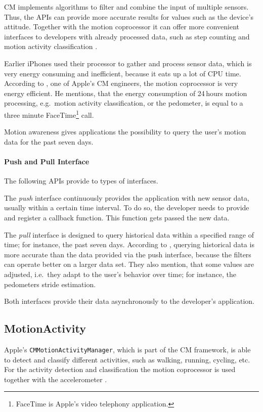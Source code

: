 \ac{CM} implements algorithms to filter and combine the input of multiple sensors. Thus, the \acsp{API} can provide more accurate results for values such as the device's attitude. Together with the motion coprocessor it can offer more convenient interfaces to developers with already processed data, such as step counting and motion activity classification \citep{apple:wwdc_2014_pham}.

Earlier iPhones used their processor to gather and process sensor data, which is very energy consuming and inefficient, because it eats up a lot of \acs{CPU} time. According to \citet{apple:wwdc_2012_pham}, one of Apple's \ac{CM} engineers, the motion coprocessor is very energy efficient. He mentions, that the energy consumption of 24\,hours motion processing, e.g.\ motion activity classification, or the pedometer, is equal to a three minute FaceTime\footnote{FaceTime is Apple's video telephony application.} call.

Motion awareness gives applications the possibility to query the user's motion data for the past seven days.

\paragraph{Push and Pull Interface}
The following \acsp{API} provide to types of interfaces.

The \emph{push} interface continuously provides the application with new sensor data, usually within a certain time interval. To do so, the developer needs to provide and register a callback function. This function gets passed the new data.

The \emph{pull} interface is designed to query historical data within a specified range of time; for instance, the past seven days. According to \citet{apple:wwdc_2014_pham}, querying historical data is more accurate than the data provided via the push interface, because the filters can operate better on a larger data set. They also mention, that some values are adjusted, i.e.\ they adapt to the user's behavior over time; for instance, the pedometers stride estimation.

Both interfaces provide their data asynchronously to the developer's application.

\subsection{MotionActivity}
Apple's \texttt{CMMotionActivityManager}, which is part of the \ac{CM} framework, is able to detect and classify different activities, such as walking, running, cycling, etc. For the activity detection and classification the motion coprocessor is used together with the accelerometer \citep{apple:wwdc_2014_pham}.

